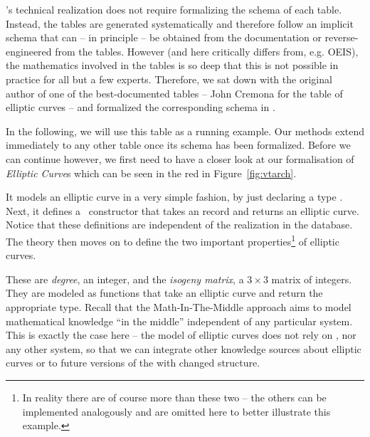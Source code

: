 \lmfdb's technical realization does not require formalizing the schema of each table. 
Instead, the tables are generated systematically and therefore follow an implicit schema that can -- in principle -- be obtained from the documentation or reverse-engineered from the tables. 
However (and here \lmfdb critically differs from, e.g. OEIS), the mathematics involved in the tables is so deep that this is not possible in practice for all but a few experts. 
Therefore, we sat down with the original author of one of the best-documented tables -- John Cremona for the table of elliptic curves -- and
formalized the corresponding schema in \ommt. 

In the following, we will use this table as a running example.
Our methods extend immediately to any other table once its schema has been formalized.
Before we can continue however, we first need to have a closer look at our formalisation of \textit{Elliptic Curve}s which can be seen in the red in Figure~\ref{fig:vtarch}. 

It models an elliptic curve in a very simple fashion, by just declaring a type . 
Next, it defines a\  constructor that takes an \mmt record and returns an elliptic curve. 
Notice that these definitions are independent of the realization in the \lmfdb database. 
The theory then moves on to define the two important properties\footnote{In reality there are of course more than these two -- the others can be implemented analogously and are omitted here to better illustrate this example.} of elliptic curves. 

These are \textit{degree}, an integer, and the \textit{isogeny matrix}, a $3 \times 3$ matrix of integers. 
They are modeled as functions that take an elliptic curve and return the appropriate type.  Recall that the Math-In-The-Middle approach aims to model mathematical
knowledge ``in the middle'' independent of any particular system. 
This is exactly the case here -- the model of elliptic curves does not rely on \lmfdb, nor any other system, so that we can integrate other knowledge sources about elliptic curves or to future versions of the \lmfdb with changed structure. 


